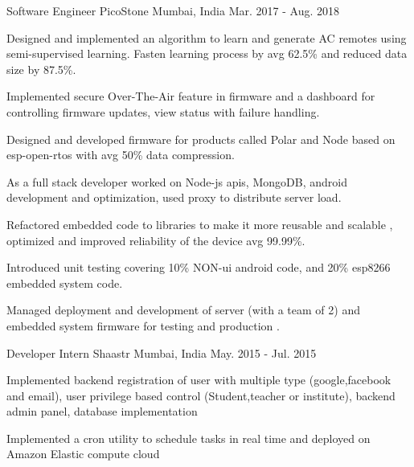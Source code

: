 

\begin{cventries}

	\cventry
	{Software Engineer} %
	{PicoStone} %
	{Mumbai, India} %
	{Mar. 2017 - Aug. 2018} %
	{ \begin{cvitems} %
			\item{Designed and implemented an algorithm to learn and generate AC remotes using semi-supervised learning. Fasten learning process by avg 62.5\% and reduced data size by 87.5\%.} %
      \item {Implemented secure Over-The-Air  feature in firmware and a dashboard for controlling firmware updates, view status with failure handling.}
      \item {Designed and developed firmware for products called Polar and Node based on esp-open-rtos with avg 50\% data compression.}  %
      \item {As a full stack developer worked on Node-js apis, MongoDB, android development and optimization, used proxy to distribute server load.}    
      \item {Refactored embedded code to libraries to make it more reusable and scalable , optimized and improved reliability of the device avg 99.99\%.}  %
      \item {Introduced unit testing covering 10\% NON-ui android code, and 20\% esp8266 embedded system code.}
      \item {Managed deployment and development of server (with a team of 2) and embedded system firmware for testing and production .}
     \end{cvitems}
  }


	\cventry
	{Developer Intern} %
	{Shaastr } %
	{Mumbai, India} %
	{May. 2015 - Jul. 2015} %
	{
		\begin{cvitems} %
			\item {Implemented backend registration of user with multiple type (google,facebook and email), user privilege based control (Student,teacher or institute), backend admin panel, database implementation}
			\item {Implemented a cron utility to schedule tasks in real time and deployed on Amazon Elastic compute cloud}
		\end{cvitems}
	}

\end{cventries}
